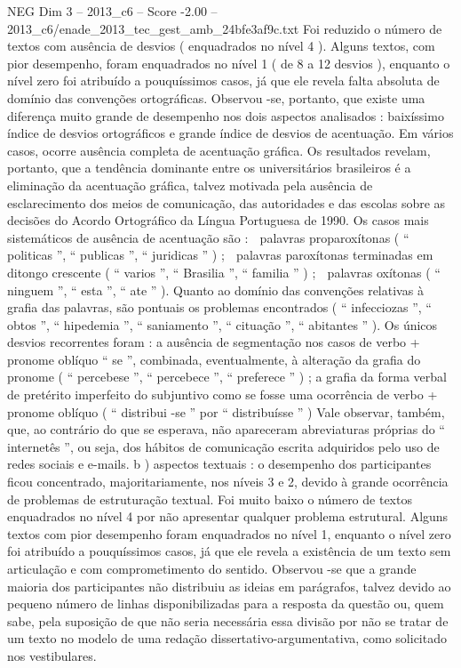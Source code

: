 \begin{textsample}{NEG Dim 3 – 2013\_c6 – Score -2.00 – 2013\_c6/enade\_2013\_tec\_gest\_amb\_24bfe3af9c.txt}
Foi reduzido o número de textos com ausência de desvios ( enquadrados no nível 4 ).
Alguns textos, com pior desempenho, foram enquadrados no nível 1 ( de 8 a 12 desvios ), enquanto o nível zero foi atribuído a pouquíssimos casos, já que ele revela falta absoluta de domínio das convenções ortográficas.
Observou -se, portanto, que existe uma diferença muito grande de desempenho nos dois aspectos analisados : baixíssimo índice de desvios ortográficos e grande índice de desvios de acentuação.
Em vários casos, ocorre ausência completa de acentuação gráfica.
Os resultados revelam, portanto, que a tendência dominante entre os universitários brasileiros é a eliminação da acentuação gráfica, talvez motivada pela ausência de esclarecimento dos meios de comunicação, das autoridades e das escolas sobre as decisões do Acordo Ortográfico da Língua Portuguesa de 1990.
Os casos mais sistemáticos de ausência de acentuação são :  palavras proparoxítonas ( “ politicas ”, “ publicas ”, “ juridicas ” ) ;  palavras paroxítonas terminadas em ditongo crescente ( “ varios ”, “ Brasilia ”, “ familia ” ) ;  palavras oxítonas ( “ ninguem ”, “ esta ”, “ ate ” ).
Quanto ao domínio das convenções relativas à grafia das palavras, são pontuais os problemas encontrados ( “ infecciozas ”, “ obtos ”, “ hipedemia ”, “ saniamento ”, “ cituação ”, “ abitantes ” ).
Os únicos desvios recorrentes foram : a ausência de segmentação nos casos de verbo + pronome oblíquo “ se ”, combinada, eventualmente, à alteração da grafia do pronome ( “ percebese ”, “ percebece ”, “ preferece ” ) ; a grafia da forma verbal de pretérito imperfeito do subjuntivo como se fosse uma ocorrência de verbo + pronome oblíquo ( “ distribui -se ” por “ distribuísse ” ) Vale observar, também, que, ao contrário do que se esperava, não apareceram abreviaturas próprias do “ internetês ”, ou seja, dos hábitos de comunicação escrita adquiridos pelo uso de redes sociais e e-mails. b ) aspectos textuais : o desempenho dos participantes ficou concentrado, majoritariamente, nos níveis 3 e 2, devido à grande ocorrência de problemas de estruturação textual.
Foi muito baixo o número de textos enquadrados no nível 4 por não apresentar qualquer problema estrutural.
Alguns textos com pior desempenho foram enquadrados no nível 1, enquanto o nível zero foi atribuído a pouquíssimos casos, já que ele revela a existência de um texto sem articulação e com comprometimento do sentido.
Observou -se que a grande maioria dos participantes não distribuiu as ideias em parágrafos, talvez devido ao pequeno número de linhas disponibilizadas para a resposta da questão ou, quem sabe, pela suposição de que não seria necessária essa divisão por não se tratar de um texto no modelo de uma redação dissertativo-argumentativa, como solicitado nos vestibulares.

\end{textsample}
